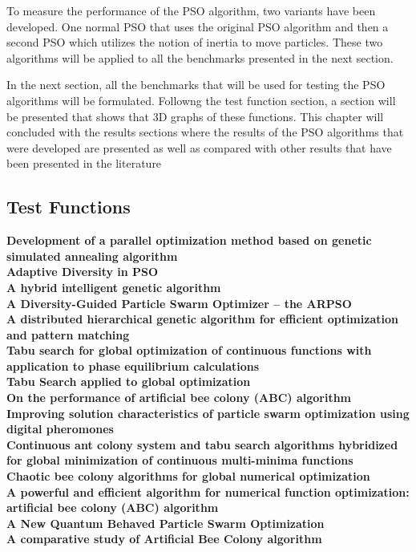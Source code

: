 To measure the performance of the PSO algorithm, two variants have been developed. One normal PSO that uses the original PSO algorithm and then a second PSO which utilizes the notion of inertia to move particles. These two algorithms will be applied to all the benchmarks presented in the next section.

In the next section, all the benchmarks that will be used for testing the PSO algorithms will be formulated. Followng the test function section, a section will be presented that shows that 3D graphs of these functions. This chapter will concluded with the results sections where the results of the PSO algorithms that were developed are presented as well as compared with other results that have been presented in the literature
\subsection{Test Functions}
\textbf{Development of a parallel optimization method based on genetic simulated annealing algorithm}\\
\textbf{Adaptive Diversity in PSO}\\
\textbf{A hybrid intelligent genetic algorithm}\\
\textbf{A Diversity-Guided Particle Swarm Optimizer – the ARPSO}\\
\textbf{A distributed hierarchical genetic algorithm for efficient optimization and pattern matching}\\
\textbf{Tabu search for global optimization of continuous functions with application to phase equilibrium calculations}\\
\textbf{Tabu Search applied to global optimization}\\
\textbf{On the performance of artificial bee colony (ABC) algorithm}\\
\textbf{Improving solution characteristics of particle swarm optimization using digital pheromones}\\
\textbf{Continuous ant colony system and tabu search algorithms hybridized for global minimization of continuous multi-minima functions}\\
\textbf{Chaotic bee colony algorithms for global numerical optimization}\\
\textbf{A powerful and efficient algorithm for numerical function optimization: artificial bee colony (ABC) algorithm}\\
\textbf{A New Quantum Behaved Particle Swarm Optimization}\\
\textbf{A comparative study of Artificial Bee Colony algorithm}\\
